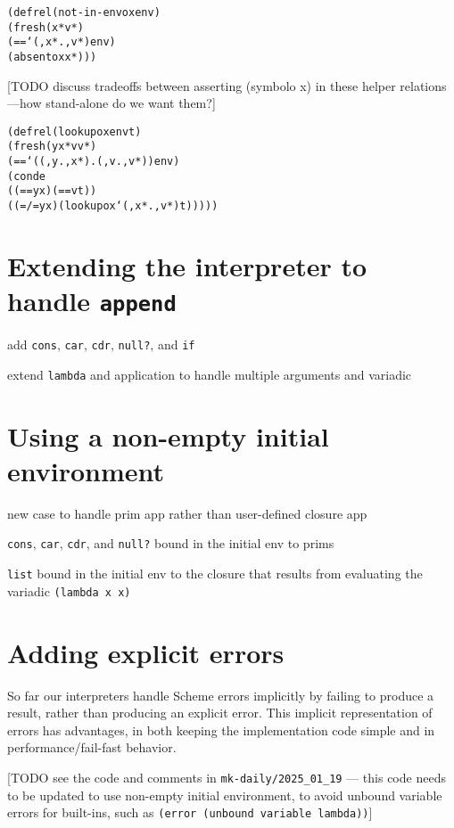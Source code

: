 \documentclass{book}
\begin{document}
\begin{alltt}
(defrel (not-in-envo x env)
  (fresh (x* v*)
    (== `(,x* . ,v*) env)
    (absento x x*)))
\end{alltt}

[TODO discuss tradeoffs between asserting (symbolo x) in these helper relations---how stand-alone do we want them?]

\begin{alltt}
(defrel (lookupo x env t)
  (fresh (y x* v v*)
    (== `((,y . ,x*) . (,v . ,v*)) env)
    (conde
      ((== y x) (== v t))
      ((=/= y x) (lookupo x `(,x* . ,v*) t)))))
\end{alltt}



\chapter{Extending the interpreter to handle \texttt{append}}%

add \verb|cons|, \verb|car|, \verb|cdr|, \verb|null?|, and \verb|if|

extend \verb|lambda| and application to handle multiple arguments and variadic 


\chapter{Using a non-empty initial environment}%

new case to handle prim app rather than user-defined closure app

\verb|cons|, \verb|car|, \verb|cdr|, and \verb|null?| bound in the initial env to prims

\verb|list| bound in the initial env to the closure that results from evaluating the variadic \verb|(lambda x x)|


\chapter{Adding explicit errors}%

So far our interpreters handle Scheme errors implicitly by failing to produce a result, rather than producing an explicit error.  This implicit representation of errors has advantages, in both keeping the implementation code simple and in performance/fail-fast behavior.

[TODO see the code and comments in \verb|mk-daily/2025_01_19| --- this code needs to be updated to use non-empty initial environment, to avoid unbound variable errors for built-ins, such as \verb|(error (unbound variable lambda))|]
\end{document}
